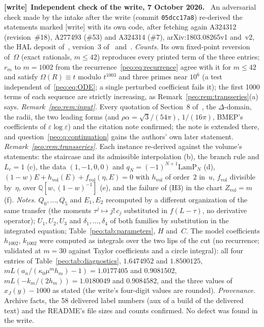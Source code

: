 \documentclass[11pt]{article}
\numberwithin{equation}{section}
\theoremstyle{remark}\newtheorem{remark}[theorem]{Remark}
\newcommand{\file}[1]{\nolinkurl{#1}}
\newenvironment{writenote}[1][]{\par\smallskip\begingroup\small
 \noindent\textbf{[write]}\if\relax\detokenize{#1}\relax\else~\textbf{#1.}\fi\ }%
 {\par\endgroup\smallskip}
\begin{document}
\begin{writenote}[Independent check of the write, 7 October 2026]
An adversarial check made by the intake after the write (commit
\file{05dcc17a8}) re-derived the statements marked [write] with its own
code, after fetching again A324312 (revision~\#18), A277493 (\#53) and
A324314 (\#7), arXiv:1803.08265v1 and~v2, the HAL deposit of~\cite{BMEP},
version~3 of~\cite{refined} and~\cite{BC}. \emph{Counts.} Its own
fixed-point reversion of~$\Omega$ (exact rationals, $m\le42$) reproduces
every printed term of the three entries; $r_m$ to $m=1002$ from the
recurrence~\eqref{peo:eq:recurrence} agree with it for $m\le42$ and satisfy
$\Omega(R)\equiv t$ modulo $t^{1003}$ and three primes near $10^6$ (a test
independent of~\eqref{peo:eq:ODE}; a single perturbed coefficient fails
it); the first 1000 terms of each sequence are strictly increasing, as
Remark~\ref{peo:rem:transseries}(a) says. \emph{Remark~\ref{peo:rem:input}.}
Every quotation of Section~8 of~\cite{BMEP}, the $\Delta$-domain, the radii,
the two leading forms (and $\rho\alpha=\sqrt3/(54\pi)$, $1/(16\pi)$, BMEP's
coefficients of $\varepsilon\log\varepsilon$) and the citation note
confirmed; the note is extended there, and question~\ref{peo:q:continuation}
gains the authors' own later statement. \emph{Remark~\ref{peo:rem:transseries}.}
Each instance re-derived against the volume's statements: the
staircase and its admissible interpolation (b), the branch rule and
$L_c=1$ (c), the data $(1,-1,0,0)$ and $q_N=(-1)^{N+1}\mathrm{LamP}_N$ (d),
$(1-w)E+h_{\mathrm{vol}}(E)+f_{\mathrm{vol}}(\eta,E)=0$ with
$h_{\mathrm{vol}}$ of order~$2$ in~$u$, $f_{\mathrm{vol}}$ divisible by~$\eta$, over
$\mathbb Q[w,(1-w)^{-1}]$ (e),
and the failure of (H3) in the chart $Z_{\mathrm{vol}}=m$ (f).
\emph{Notes.} $Q_0,\dots,Q_5$ and $E_1,E_2$ recomputed by a different
organization of the same transfer (the moments $\tau^j\mapsto j!\,c_j$
substituted in $f(L-\tau)$, no derivative operator); $U_1,U_2,U_3$ and
$\delta_1,\dots,\delta_4$ of both families by substitution in the integrated
equation; Table~\ref{peo:tab:parameters}, $H$ and~$C$. The model
coefficients $h_{1002}$, $k_{1002}$ were computed as integrals over the two
lips of the cut (no recurrence; validated at $m=30$ against Taylor
coefficients and a circle integral): all four entries of
Table~\ref{peo:tab:diagnostics}, $1.6474952$ and $1.8500125$,
$mL(a_n/(\kappa_0\mu^mh_m)-1)=1.0177405$ and $0.9081502$,
$mL(-k_m/(2h_m))=1.0180049$ and $0.9084582$, and the three values of
$x_J(y)-1000$ as stated (the write's four-digit values are rounded).
\emph{Provenance.} Archive facts, the 58 delivered label numbers (aux of a
build of the delivered text) and the README's file sizes and counts
confirmed. No defect was found in the write.
\end{writenote}
\end{document}
